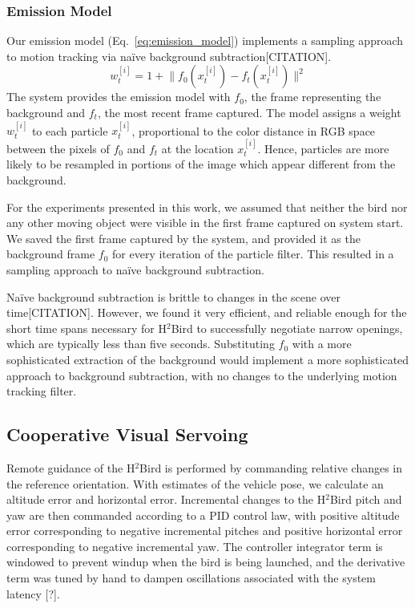 \documentclass{aamas2013}
\providecommand{\norm}[1]{\lVert#1\rVert}
\begin{document}
\subsubsection{Emission Model}
Our emission model (Eq.~\ref{eq:emission_model}) implements a sampling
approach to motion tracking via na\"{i}ve background subtraction[CITATION].
\begin{equation}
\label{eq:emission_model}
w^{[i]}_t = 1 + \norm{f_0(x^{[i]}_t)-f_t(x^{[i]}_t)}^2
\end{equation} 
The system provides the emission model with $f_0$, the frame representing 
the background and $f_t$, the most recent frame captured. The model assigns 
a weight $w^{[i]}_t$ to each particle $x^{[i]}_t$, proportional to the color 
distance in RGB space between the pixels of $f_0$ and $f_t$ at the location 
$x^{[i]}_t$. Hence, particles are more likely to be resampled in portions of 
the image which appear different from the background.

For the experiments presented in this work, we assumed that neither the bird 
nor any other moving object were visible in the first frame captured on system 
start. We saved the first frame captured by the system, and provided it as 
the background frame $f_0$ for every iteration of the particle filter. This 
resulted in a sampling approach to na\"{i}ve background subtraction. 

Na\"{i}ve background subtraction is brittle to changes in the scene over 
time[CITATION]. However, we found it very efficient, and reliable enough for the 
short time spans necessary for H$^2$Bird to successfully negotiate narrow 
openings, which are typically less than five seconds. Substituting $f_0$ 
with a more sophisticated extraction of the background would implement a 
more sophisticated approach to background subtraction, with no changes to 
the underlying motion tracking filter.

\subsection{Cooperative Visual Servoing}
\label{sec:visual_servoing_concept}
Remote guidance of the H$^2$Bird is performed by commanding relative changes in the
reference orientation. With estimates of the vehicle pose, we calculate an altitude
error and horizontal error. Incremental changes to the H$^2$Bird pitch and yaw are
then commanded according to a PID control law, with positive altitude error
corresponding to negative incremental pitches and positive horizontal error
corresponding to negative incremental yaw. The controller integrator term is windowed
to prevent windup when the bird is being launched, and the derivative term was tuned
by hand to dampen oscillations associated with the system latency [?].
\end{document}
